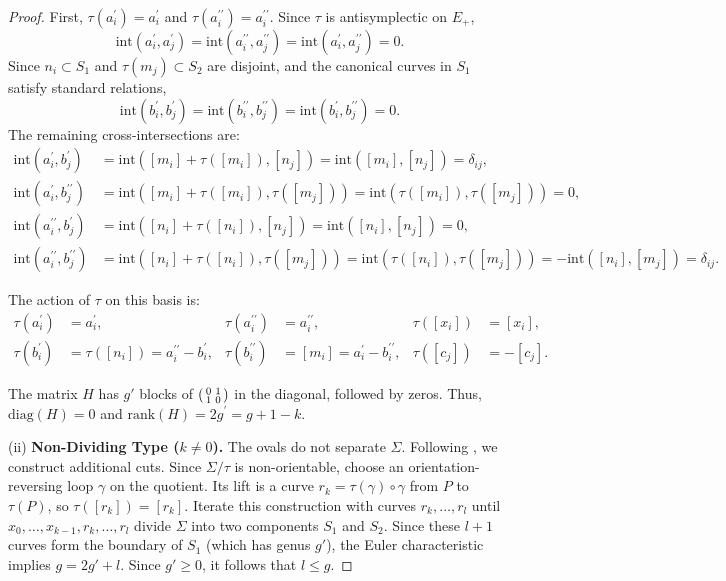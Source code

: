 \documentclass[11pt,a4paper]{article}
\theoremstyle{definition}
\begin{document}
\begin{proof}
	First, $\tau(a^{\prime}_i)=a^{\prime}_i$ and $\tau(a^{\prime\prime}_i)=a^{\prime\prime}_i$. Since $\tau$ is antisymplectic on $E_+$,
	\[
	\mathrm{int}(a^{\prime}_i, a^{\prime}_j) = \mathrm{int}(a^{\prime\prime}_i, a^{\prime\prime}_j) = \mathrm{int}(a^{\prime}_i, a^{\prime\prime}_j) = 0.
	\]
	Since $n_i \subset S_1$ and $\tau(m_j) \subset S_2$ are disjoint, and the canonical curves in $S_1$ satisfy standard relations,
	\[
	\mathrm{int}(b^{\prime}_i, b^{\prime}_j) = \mathrm{int}(b^{\prime\prime}_i, b^{\prime\prime}_j) = \mathrm{int}(b^{\prime}_i, b^{\prime\prime}_j) = 0.
	\]
	The remaining cross-intersections are:
	\begin{align*}
		\mathrm{int}(a^{\prime}_i, b^{\prime}_j) &= \mathrm{int}([m_i]+\tau([m_i]), [n_j]) = \mathrm{int}([m_i], [n_j]) = \delta_{ij},\\
		\mathrm{int}(a^{\prime}_i, b^{\prime \prime}_j) &= \mathrm{int}([m_i]+\tau([m_i]), \tau([m_j])) = \mathrm{int}(\tau([m_i]),\tau([m_j])) = 0, \\
		\mathrm{int}(a^{\prime\prime}_i, b^{\prime}_j) &= \mathrm{int}([n_i]+\tau([n_i]), [n_j]) = \mathrm{int}([n_i], [n_j]) = 0,\\
		\mathrm{int}(a^{\prime\prime}_i, b^{\prime\prime}_j) &= \mathrm{int}([n_i]+\tau([n_i]), \tau([m_j])) = \mathrm{int}(\tau([n_i]), \tau([m_j])) = -\mathrm{int}([n_i], [m_j]) = \delta_{ij}.
	\end{align*}
	
	The action of $\tau$ on this basis is:
	\begin{align*}
		\tau(a^{\prime}_i) &= a^{\prime}_i, & \tau(a^{\prime\prime}_i) &= a^{\prime\prime}_i, & \tau([x_i]) &= [x_i], \\
		\tau(b^{\prime}_i) &= \tau([n_i]) = a^{\prime\prime}_i - b^{\prime}_i, & \tau(b^{\prime\prime}_i) &= [m_i] = a^{\prime}_i - b^{\prime\prime}_i, & \tau([c_j]) &= -[c_j].
	\end{align*}
	
	The matrix $H$ has $g'$ blocks of $\begin{psmallmatrix} 0 & 1 \\ 1 & 0 \end{psmallmatrix}$ in the diagonal, followed by zeros. Thus, $\mathrm{diag}(H) = 0$ and $\mathrm{rank}(H) = 2g^{\prime} = g + 1 - k$.
	
(ii) \textbf{Non-Dividing Type ($k \neq 0$).} The ovals do not separate $\Sigma$. Following \cite{Kra82}, we construct additional cuts. Since $\Sigma/\tau$ is non-orientable, choose an orientation-reversing loop $\gamma$ on the quotient. Its lift is a curve $r_k = \tau(\gamma) \circ \gamma$ from $P$ to $\tau(P)$, so $\tau([r_k]) = [r_k]$.
Iterate this construction with curves $r_k, \dots, r_l$ until $x_0, \ldots, x_{k-1}, r_k, \ldots, r_l$ divide $\Sigma$ into two components $S_1$ and $S_2$.
Since these $l+1$ curves form the boundary of $S_1$ (which has genus $g'$), the Euler characteristic implies $g = 2g' + l$. Since $g' \geq 0$, it follows that $l \leq g$.


\end{proof}
\end{document}
